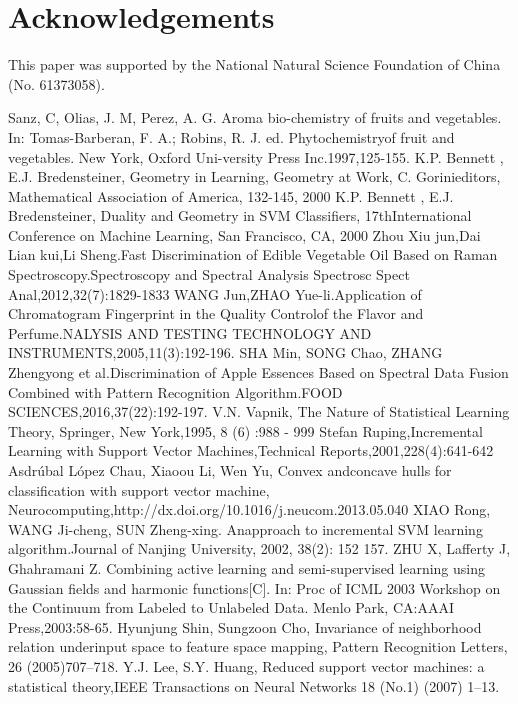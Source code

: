\documentclass[a4paper]{article}
\begin{document}
\section{Acknowledgements}
This paper was supported by the National Natural Science Foundation of China (No. 61373058).

\renewcommand\refname{References}
\begin{thebibliography}{30}
    Sanz, C, Olias,  J.  M,  Perez,  A.  G. Aroma  bio-chemistry  of  fruits  and  vegetables.  In:  Tomas-Barberan,  F. A.; Robins, R. J. ed. Phytochemistryof  fruit  and  vegetables.  New  York,  Oxford  Uni-versity  Press  Inc.1997,125-155.
    K.P. Bennett , E.J. Bredensteiner, Geometry in Learning, Geometry at Work, C. Gorinieditors, Mathematical Association of America, 132-145, 2000
    K.P. Bennett , E.J. Bredensteiner, Duality and Geometry in SVM Classiﬁers, 17thInternational Conference on Machine Learning, San Francisco, CA, 2000
    Zhou Xiu jun,Dai Lian kui,Li Sheng.Fast Discrimination of Edible Vegetable Oil Based on Raman Spectroscopy.Spectroscopy and Spectral Analysis Spectrosc Spect Anal,2012,32(7):1829-1833
    WANG Jun,ZHAO Yue-li.Application of Chromatogram Fingerprint in the Quality Controlof the Flavor and Perfume.NALYSIS AND TESTING TECHNOLOGY AND INSTRUMENTS,2005,11(3):192-196.
    SHA Min, SONG Chao, ZHANG Zhengyong et al.Discrimination of Apple Essences Based on Spectral Data Fusion Combined with Pattern Recognition Algorithm.FOOD SCIENCES,2016,37(22):192-197.
    V.N. Vapnik, The Nature of Statistical Learning Theory, Springer, New York,1995, 8 (6) :988 - 999
    Stefan Ruping,Incremental Learning with Support Vector Machines,Technical Reports,2001,228(4):641-642
    Asdrúbal López Chau, Xiaoou Li, Wen Yu, Convex andconcave hulls for classification with support vector machine, Neurocomputing,http://dx.doi.org/10.1016/j.neucom.2013.05.040
    XIAO Rong, WANG Ji-cheng, SUN Zheng-xing. Anapproach to incremental SVM learning algorithm.Journal of Nanjing University, 2002, 38(2): 152 157.           
    ZHU X, Lafferty J, Ghahramani Z. Combining active learning and semi-supervised learning using Gaussian fields  and  harmonic  functions[C].  In:  Proc  of  ICML  2003  Workshop  on  the  Continuum  from  Labeled  to Unlabeled Data. Menlo Park, CA:AAAI Press,2003:58-65.
    Hyunjung Shin, Sungzoon Cho, Invariance of neighborhood relation underinput space to feature space mapping, Pattern Recognition Letters, 26 (2005)707–718.
    Y.J. Lee, S.Y. Huang, Reduced support vector machines: a statistical theory,IEEE Transactions on Neural Networks 18 (No.1) (2007) 1–13.

        
\end{thebibliography}
\end{document}
